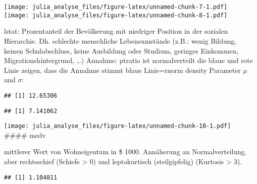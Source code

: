 \documentclass[]{article}
\newenvironment{Shaded}{\begin{snugshade}}{\end{snugshade}}
\newcommand{\KeywordTok}[1]{\textcolor[rgb]{0.13,0.29,0.53}{\textbf{#1}}}
\newcommand{\OperatorTok}[1]{\textcolor[rgb]{0.81,0.36,0.00}{\textbf{#1}}}
\newcommand{\NormalTok}[1]{#1}
\begin{document}
\texttt{[image: julia\_analyse\_files/figure-latex/unnamed-chunk-7-1.pdf]}
\texttt{[image: julia\_analyse\_files/figure-latex/unnamed-chunk-8-1.pdf]}

lstat: Prozentanteil der Bevölkerung mit niedriger Position in der
sozialen Hierarchie. Dh. schlechte menschliche Lebensumstände (z.B.:
wenig Bildung, keinen Schulabschluss, keine Ausbildung oder Studium,
geringes Einkommen, Migrationshintergrund, \ldots{}) Annahme: ptratio
ist normalverteilt die blaue und rote Linie zeigen, dass die Annahme
stimmt blaue Linie=rnorm density Parameter \(\mu\) und \(\sigma\):

\begin{Shaded}
\end{Shaded}

\begin{verbatim}
## [1] 12.65306
\end{verbatim}

\begin{Shaded}
\end{Shaded}

\begin{verbatim}
## [1] 7.141062
\end{verbatim}

\texttt{[image: julia\_analyse\_files/figure-latex/unnamed-chunk-10-1.pdf]}
\#\#\#\# medv

 mittlerer Wert von Wohneigentum in \$ 1000. Annäherung an
Normalverteilung, aber rechtsschief (Schiefe \textgreater{} 0) und
leptokurtisch (steilgipfelig) (Kurtosis \textgreater{} 3).

\begin{Shaded}
\end{Shaded}

\begin{verbatim}
## [1] 1.104811
\end{verbatim}

\begin{Shaded}
\end{Shaded}
\end{document}
